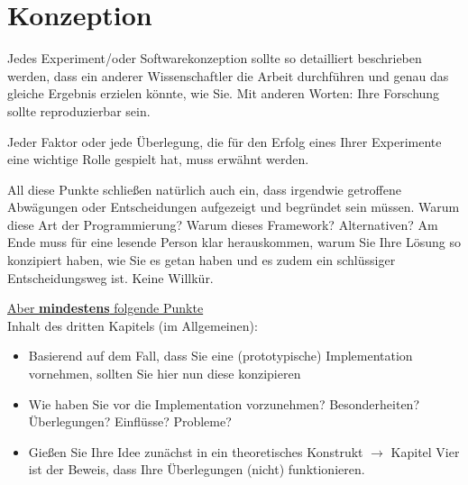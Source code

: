 

\clearpage
\chapter{Konzeption}

Jedes Experiment/oder Softwarekonzeption sollte so detailliert beschrieben werden, dass ein anderer Wissenschaftler die Arbeit durchführen und genau das gleiche Ergebnis erzielen könnte, wie Sie. 
Mit anderen Worten: Ihre Forschung sollte reproduzierbar sein.

Jeder Faktor oder jede Überlegung, die für den Erfolg eines Ihrer Experimente eine wichtige Rolle gespielt hat, muss erwähnt werden.

All diese Punkte schließen natürlich auch ein, dass irgendwie getroffene Abwägungen oder Entscheidungen aufgezeigt und begründet sein müssen. Warum diese Art der Programmierung? Warum dieses Framework?
Alternativen? Am Ende muss für eine lesende Person klar herauskommen, warum Sie Ihre Lösung so konzipiert haben, wie Sie es getan haben und es zudem ein schlüssiger Entscheidungsweg ist. Keine Willkür.

\underline{Aber \textbf{mindestens} folgende Punkte}\\
Inhalt des dritten Kapitels (im Allgemeinen):
\begin{itemize}
    \item Basierend auf dem Fall, dass Sie eine (prototypische) Implementation vornehmen, sollten Sie hier nun diese konzipieren
    \item Wie haben Sie vor die Implementation vorzunehmen? Besonderheiten? Überlegungen? Einflüsse? Probleme?
    \item Gießen Sie Ihre Idee zunächst in ein theoretisches Konstrukt $\rightarrow$ Kapitel Vier ist der Beweis, dass Ihre Überlegungen (nicht) funktionieren.
\end{itemize}
